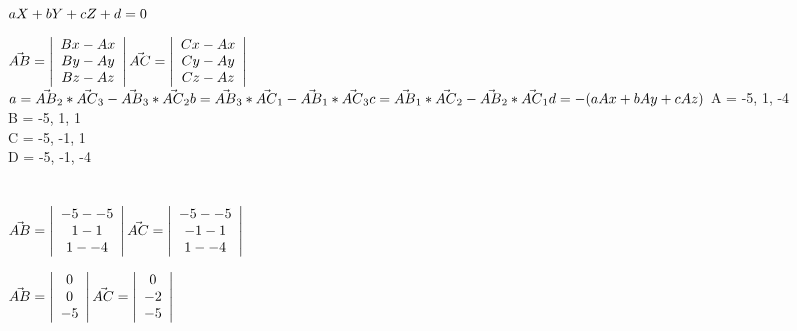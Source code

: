 \documentclass{article}
\begin{document}
$
aX + bY + cZ + d = 0 \\ 
$

$
\vec{AB} = \left| \begin{array}{c}
Bx - Ax \\
By - Ay \\
Bz - Az
\end{array} \right|
\vec{AC} = \left| \begin{array}{c}
Cx - Ax \\
Cy - Ay \\
Cz - Az
\end{array} \right| \\ \\ \\
$
$
a = \vec{AB}_2 * \vec{AC}_3 - \vec{AB}_3 * \vec{AC}_2 \\
b = \vec{AB}_3 * \vec{AC}_1 - \vec{AB}_1 * \vec{AC}_3 \\
c = \vec{AB}_1 * \vec{AC}_2 - \vec{AB}_2 * \vec{AC}_1 \\ 
d = -(aAx + bAy + cAz) \\ \\ \\
$
\noindent
A = -5, 1, -4 \\
B = -5, 1, 1 \\
C = -5, -1, 1 \\
D = -5, -1, -4 \\ \\ \\

$
\vec{AB} = \left| \begin{array}{c}
-5 - -5 \\
1 - 1 \\
1 - -4
\end{array} \right|
\vec{AC} = \left| \begin{array}{c}
-5 - -5 \\
-1 - 1 \\
1 - -4
\end{array} \right| \\ \\ \\
$

$
\vec{AB} = \left| \begin{array}{c}
0 \\
0 \\
-5
\end{array} \right|
\vec{AC} = \left| \begin{array}{c}
0 \\
-2 \\
-5
\end{array} \right| \\ \\ \\
$
\end{document}
